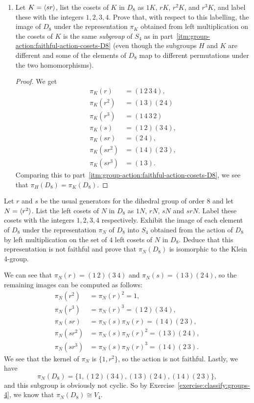 \begin{enumerate}
\item Let $K = \langle{sr}\rangle$, list the cosets of $K$ in $D_8$ as $1K$,
  $rK$, $r^2K$, and $r^3K$, and label these with the integers
  $1,2,3,4$. Prove that, with respect to this labelling, the image of
  $D_8$ under the representation $\pi_K$ obtained from left
  multiplication on the cosets of $K$ is the same {\em subgroup} of
  $S_4$ as in part~\ref{itm:group-action:faithful-action-cosets-D8}
  (even though the subgroups $H$ and $K$ are different and some of the
  elements of $D_8$ map to different permutations under the two
  homomorphisms).
  \begin{proof}
    We get
    \begin{align*}
      \pi_K(r) &= (1\,2\,3\,4), \\
      \pi_K(r^2) &= (1\,3)(2\,4) \\
      \pi_K(r^3) &= (1\,4\,3\,2) \\
      \pi_K(s) &= (1\,2)(3\,4), \\
      \pi_K(sr) &= (2\,4), \\
      \pi_K(sr^2) &= (1\,4)(2\,3), \\
      \pi_K(sr^3) &= (1\,3).
    \end{align*}
    Comparing this to
    part~\ref{itm:group-action:faithful-action-cosets-D8}, we see that
    $\pi_H(D_8) = \pi_K(D_8)$.
  \end{proof}
\end{enumerate}

 Let $r$ and $s$ be the usual generators for the dihedral
group of order $8$ and let $N = \langle{r^2}\rangle$. List the left cosets of
$N$ in $D_8$ as $1N$, $rN$, $sN$ and $srN$. Label these cosets with
the integers $1,2,3,4$ respectively. Exhibit the image of each element
of $D_8$ under the representation $\pi_N$ of $D_8$ into $S_4$ obtained
from the action of $D_8$ by left multiplication on the set of $4$ left
cosets of $N$ in $D_8$. Deduce that this representation is not
faithful and prove that $\pi_N(D_8)$ is isomorphic to the Klein
4-group.
\begin{solution}
  We can see that $\pi_N(r) = (1\,2)(3\,4)$ and
  $\pi_N(s) = (1\,3)(2\,4)$, so the remaining images can be computed as
  follows:
  \begin{align*}
    \pi_N(r^2) &= \pi_N(r)^2 = 1, \\
    \pi_N(r^3) &= \pi_N(r)^3 = (1\,2)(3\,4), \\
    \pi_N(sr) &= \pi_N(s)\pi_N(r) = (1\,4)(2\,3), \\
    \pi_N(sr^2) &= \pi_N(s)\pi_N(r)^2 = (1\,3)(2\,4), \\
    \pi_N(sr^3) &= \pi_N(s)\pi_N(r)^3 = (1\,4)(2\,3).
  \end{align*}
  We see that the kernel of $\pi_N$ is $\{1, r^2\}$, so the action is
  not faithful. Lastly, we have
  \begin{equation*}
    \pi_N(D_8) = \{1, (1\,2)(3\,4), (1\,3)(2\,4), (1\,4)(2\,3)\},
  \end{equation*}
  and this subgroup is obviously not cyclic. So by
  Exercise~\ref{exercise:classify:groups-4}, we know that
  $\pi_N(D_8)\cong V_4$.
\end{solution}

